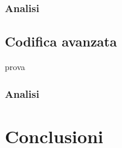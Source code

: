 \subsubsection{Analisi}





\vspace{15px}\subsection{Codifica avanzata}

prova



\subsubsection{Analisi}





\vspace{30px}\section{Conclusioni}





